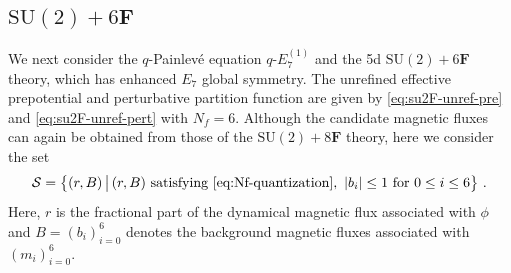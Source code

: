 \documentclass[11pt, a4paper]{article}
\theoremstyle{definition}
\begin{document}
\subsection{\texorpdfstring{$ \mathrm{SU}(2) + 6\mathbf{F} $}{SU(2) + 6F}}\label{sec:6F}

We next consider the $ q $-Painlev\'e equation $ q\text{-}E_7^{(1)} $ and the 5d $ \mathrm{SU}(2)+6\mathbf{F} $ theory, which has enhanced $ E_7 $ global symmetry. The unrefined effective prepotential and perturbative partition function are given by \eqref{eq:su2F-unref-pre} and \eqref{eq:su2F-unref-pert} with $ N_f=6 $. Although the candidate magnetic fluxes can again be obtained from those of the $ \mathrm{SU}(2)+8\mathbf{F} $ theory, here we consider the set
\begin{align}
    \mathcal{S} = \left\{ (r,B) \, \big| \, (r,B) \text{ satisfying \eqref{eq:Nf-quantization}}, \ |b_i| \leq 1 \text{ for } 0 \leq i \leq 6 \right\} \, .
\end{align}
Here, $ r $ is the fractional part of the dynamical magnetic flux associated with $ \phi $ and $ B=(b_i)_{i=0}^6 $ denotes the background magnetic fluxes associated with $ (m_i)_{i=0}^6 $.
\end{document}
